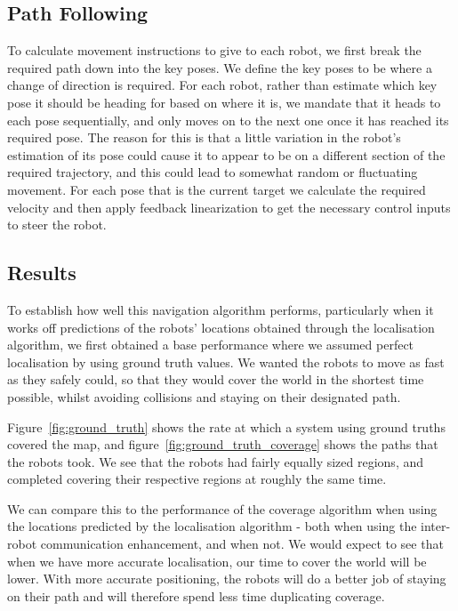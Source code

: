 \documentclass[a4paper, 10pt, conference]{ieeeconf}      %
\begin{document}
\subsection{Path Following}
To calculate movement instructions to give to each robot, we first break the required path down into the key poses. We define the key poses to be where a change of direction is required. For each robot, rather than estimate which key pose it should be heading for based on where it is, we mandate that it heads to each pose sequentially, and only moves on to the next one once it has reached its required pose. The reason for this is that a little variation in the robot's estimation of its pose could cause it to appear to be on a different section of the required trajectory, and this could lead to somewhat random or fluctuating movement. For each pose that is the current target we calculate the required velocity and then apply feedback linearization to get the necessary control inputs to steer the robot.



\subsection{Results}
To establish how well this navigation algorithm performs, particularly when it works off predictions of the robots' locations obtained through the localisation algorithm, we first obtained a base performance where we assumed perfect localisation by using ground truth values. We wanted the robots to move as fast as they safely could, so that they would cover the world in the shortest time possible, whilst avoiding collisions and staying on their designated path.

Figure~\ref{fig:ground_truth} shows the rate at which a system using ground truths covered the map, and figure~\ref{fig:ground_truth_coverage} shows the paths that the robots took. We see that the robots had fairly equally sized regions, and completed covering their respective regions at roughly the same time.


We can compare this to the performance of the coverage algorithm when using the locations predicted by the localisation algorithm - both when using the inter-robot communication enhancement, and when not. We would expect to see that when we have more accurate localisation, our time to cover the world will be lower. With more accurate positioning, the robots will do a better job of staying on their path and will therefore spend less time duplicating coverage. 
\end{document}
